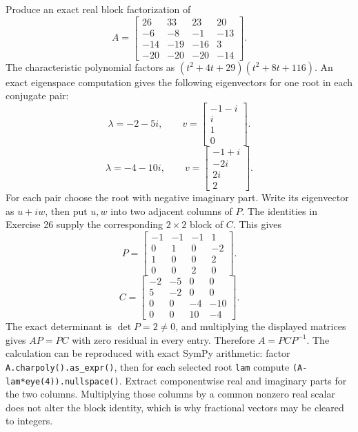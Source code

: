 \goal Produce an exact real block factorization of
\[A=\begin{bmatrix}26&33&23&20\\-6&-8&-1&-13\\-14&-19&-16&3\\-20&-20&-20&-14\end{bmatrix}.\]
The characteristic polynomial factors as $\left(t^{2} + 4 t + 29\right) \left(t^{2} + 8 t + 116\right)$. An exact eigenspace computation gives the following eigenvectors for one root in each conjugate pair:
\[\lambda=-2 - 5 i,\qquad v=\begin{bmatrix}-1 - i\\i\\1\\0\end{bmatrix}.\]
\[\lambda=-4 - 10 i,\qquad v=\begin{bmatrix}-1 + i\\- 2 i\\2 i\\2\end{bmatrix}.\]
For each pair choose the root with negative imaginary part. Write its eigenvector as $u+iw$, then put $u,w$ into two adjacent columns of $P$. The identities in Exercise 26 supply the corresponding $2\times2$ block of $C$. This gives
\[P=\begin{bmatrix}-1&-1&-1&1\\0&1&0&-2\\1&0&0&2\\0&0&2&0\end{bmatrix}.\]
\[C=\begin{bmatrix}-2&-5&0&0\\5&-2&0&0\\0&0&-4&-10\\0&0&10&-4\end{bmatrix}.\]
The exact determinant is $\det P=2\ne0$, and multiplying the displayed matrices gives $AP=PC$ with zero residual in every entry. Therefore $A=PCP^{-1}$.
The calculation can be reproduced with exact SymPy arithmetic: factor \texttt{A.charpoly().as\_expr()}, then for each selected root \texttt{lam} compute \texttt{(A-lam*eye(4)).nullspace()}. Extract componentwise real and imaginary parts for the two columns. Multiplying those columns by a common nonzero real scalar does not alter the block identity, which is why fractional vectors may be cleared to integers.

